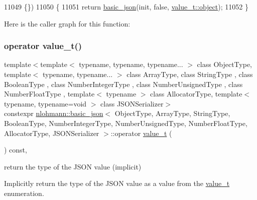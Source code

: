 \begin{DoxyCode}
11049                                                        \{\})
11050     \{
11051         \textcolor{keywordflow}{return} \hyperlink{classnlohmann_1_1basic__json_aed115142bd0c6c66c864700e0467df55}{basic\_json}(init, \textcolor{keyword}{false}, \hyperlink{namespacenlohmann_1_1detail_a1ed8fc6239da25abcaf681d30ace4985aa8cfde6331bd59eb2ac96f8911c4b666}{value\_t::object});
11052     \}
\end{DoxyCode}
Here is the caller graph for this function\+:
\mbox{\label{classnlohmann_1_1basic__json_a26ef3058e249f82a04f8ec18f7419027}} 
\subsubsection{\texorpdfstring{operator value\+\_\+t()}{operator value\_t()}}
{\footnotesize\ttfamily template$<$template$<$ typename, typename, typename... $>$ class Object\+Type, template$<$ typename, typename... $>$ class Array\+Type, class String\+Type , class Boolean\+Type , class Number\+Integer\+Type , class Number\+Unsigned\+Type , class Number\+Float\+Type , template$<$ typename $>$ class Allocator\+Type, template$<$ typename, typename=void $>$ class J\+S\+O\+N\+Serializer$>$ \\
constexpr \hyperlink{classnlohmann_1_1basic__json}{nlohmann\+::basic\+\_\+json}$<$ Object\+Type, Array\+Type, String\+Type, Boolean\+Type, Number\+Integer\+Type, Number\+Unsigned\+Type, Number\+Float\+Type, Allocator\+Type, J\+S\+O\+N\+Serializer $>$\+::operator \hyperlink{namespacenlohmann_1_1detail_a1ed8fc6239da25abcaf681d30ace4985}{value\+\_\+t} (\begin{DoxyParamCaption}{ }\end{DoxyParamCaption}) const\hspace{0.3cm}{\ttfamily [inline]}, {\ttfamily [noexcept]}}



return the type of the J\+S\+ON value (implicit) 

Implicitly return the type of the J\+S\+ON value as a value from the \hyperlink{classnlohmann_1_1basic__json_ae8cbef097f7da18a781fc86587de6b90}{value\+\_\+t} enumeration.

